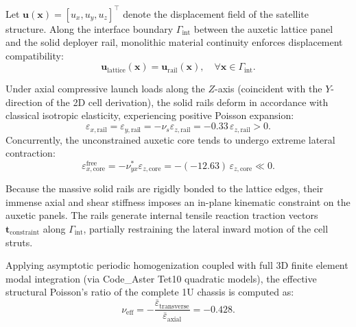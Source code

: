 Let $\mathbf{u}(\mathbf{x}) = [u_x, u_y, u_z]^\top$ denote the displacement field of the satellite structure. Along the interface boundary $\Gamma_{\text{int}}$ between the auxetic lattice panel and the solid deployer rail, monolithic material continuity enforces displacement compatibility:
\begin{equation}
\mathbf{u}_{\text{lattice}}(\mathbf{x}) = \mathbf{u}_{\text{rail}}(\mathbf{x}), \quad \forall \mathbf{x} \in \Gamma_{\text{int}}.
\label{eq:displacement_compatibility}
\end{equation}

Under axial compressive launch loads along the $Z$-axis (coincident with the $Y$-direction of the 2D cell derivation), the solid rails deform in accordance with classical isotropic elasticity, experiencing positive Poisson expansion:
\begin{equation}
\varepsilon_{x,\text{rail}} = \varepsilon_{y,\text{rail}} = -\nu_s \varepsilon_{z,\text{rail}} = -0.33 \, \varepsilon_{z,\text{rail}} > 0.
\label{eq:rail_expansion}
\end{equation}
Concurrently, the unconstrained auxetic core tends to undergo extreme lateral contraction:
\begin{equation}
\varepsilon_{x,\text{core}}^{\text{free}} = -\nu_{yx}^* \varepsilon_{z,\text{core}} = -(-12.63) \, \varepsilon_{z,\text{core}} \ll 0.
\label{eq:core_contraction}
\end{equation}

Because the massive solid rails are rigidly bonded to the lattice edges, their immense axial and shear stiffness imposes an in-plane kinematic constraint on the auxetic panels. The rails generate internal tensile reaction traction vectors $\mathbf{t}_{\text{constraint}}$ along $\Gamma_{\text{int}}$, partially restraining the lateral inward motion of the cell struts.

Applying asymptotic periodic homogenization \cite{gibson1997} coupled with full 3D finite element modal integration (via Code\_Aster Tet10 quadratic models), the effective structural Poisson's ratio of the complete 1U chassis is computed as:
\begin{equation}
\nu_{\text{eff}} = -\frac{\bar{\varepsilon}_{\text{transverse}}}{\bar{\varepsilon}_{\text{axial}}} = \mathbf{-0.428}.
\label{eq:nu_effective_chassis}
\end{equation}

